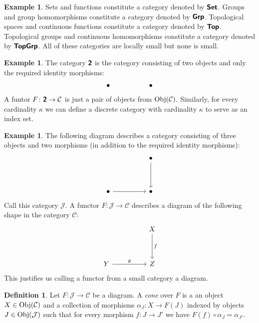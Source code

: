 \documentclass[12pt]{article}
\theoremstyle{definition}
\newtheorem{dfn}[thm]{Definition}
\newtheorem{exm}[thm]{Example}
\theoremstyle{remark}
\newcommand{\catvar}[1]{\mathcal{#1}}
\newcommand{\CC}{\catvar{C}}
\newcommand{\JJ}{\catvar{J}}
\newcommand{\catname}[1]{\textup{\sffamily\textbf{#1}}}
\newcommand*{\Set}{\catname{Set}}
\newcommand*{\Grp}{\catname{Grp}}
\newcommand*{\Top}{\catname{Top}}
\newcommand*{\TopGrp}{\catname{TopGrp}}
\newcommand{\Obj}[1]{\textup{Obj}(#1)}
\begin{document}
    \begin{exm}
        Sets and functions constitute a category denoted by $\Set$. Groups and group homomorphisms constitute a category denoted by $\Grp$. Topological spaces and continuous functions constitute a category denoted by $\Top$. Topological groups and continuous homomorphisms constitute a category denoted by $\TopGrp$. All of these categories are locally small but none is small.
    \end{exm}

    \begin{exm}
        The category $\catname{2}$ is the category consisting of two objects and only the required identity morphisms:
            \[\begin{tikzcd}
                \bullet && \bullet
            \end{tikzcd}\]
        A funtor $F\colon\catname{2}\to\CC$ is just a pair of objects from $\Obj{\CC}$. Similarly, for every cardinality $\kappa$ we can define a discrete category with cardinality $\kappa$ to serve as an index set.
    \end{exm}

    \begin{exm}\label{exm:pod}
        The following diagram describes a category consisting of three objects and two morphisms (in addition to the required identity morphisms):
        \[\begin{tikzcd}
            && \bullet \\
            \\
            \bullet && \bullet
            \arrow[from=1-3, to=3-3]
            \arrow[from=3-1, to=3-3]
        \end{tikzcd}\]
        Call this category $\catvar{J}$. A functor $F\colon \JJ\to\CC$ describes a diagram of the following shape in the category $\CC$:
        \[\begin{tikzcd}
            && X \\
            \\
            Y && Z
            \arrow["f", from=1-3, to=3-3]
            \arrow["g", from=3-1, to=3-3]
        \end{tikzcd}\]
        This justifies us calling a functor from a small category a diagram.
    \end{exm}

    \begin{dfn}
        Let $F\colon\JJ\to\CC$ be a diagram. A \emph{cone} over $F$ is a an object $X\in\Obj{\CC}$ and a collection of morphisms $\alpha_J\colon X\to F(J)$ indexed by objects $J\in\Obj{\JJ}$ such that for every morphism $f\colon J\to J'$ we have $F(f)\circ \alpha_{J}=\alpha_{J'}$.
    \end{dfn}
\end{document}
